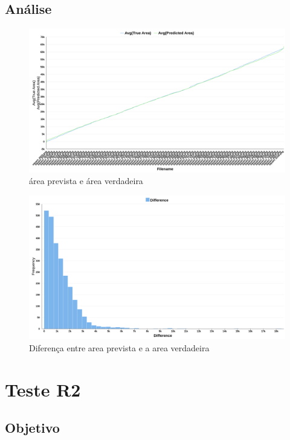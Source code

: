  \subsection{Análise}       
        \begin{figure}[H]
	        \centering
	        \includegraphics[width=1.0\linewidth]{imgs/Test_8/area_predict_true_line.png}
	          \caption{área prevista e área verdadeira}
	        \label{fig:enter-label}
        \end{figure}
        \begin{figure}[H]
	        \centering
	        \includegraphics[width=1.0\linewidth]{imgs/Test_8/area_diference_hist.png}
	        \caption{Diferença entre area prevista e a area verdadeira}
	        \label{fig:enter-label}
    \end{figure}
    
   \section{Teste R2}
\subsection{Objetivo}

